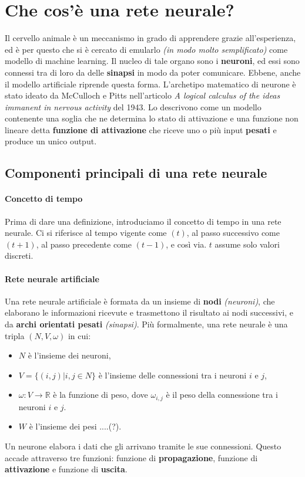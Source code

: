 \documentclass[12pt, twoside, letterpaper]{report}
\begin{document}
		\section{Che cos'è una rete neurale?}
			Il cervello animale è un meccanismo in grado di apprendere grazie all'esperienza, ed è per questo che si è cercato di emularlo \textit{(in modo molto semplificato)} come modello di machine learning. Il nucleo di tale organo sono i \textbf{neuroni}, ed essi sono connessi tra di loro da delle \textbf{sinapsi} in modo da poter comunicare. Ebbene, anche il modello artificiale riprende questa forma. L'archetipo matematico di neurone è stato ideato da McCulloch e Pitts nell'articolo \textit{A logical calculus of the ideas immanent in nervous activity} del 1943. Lo descrivono come un modello contenente una soglia che ne determina lo stato di attivazione e una funzione non lineare detta \textbf{funzione di attivazione} che riceve uno o più input \textbf{pesati} e produce un unico output.
			
		\subsection{Componenti principali di una rete neurale} 
			\paragraph{Concetto di tempo} Prima di dare una definizione, introduciamo il concetto di tempo in una rete neurale. Ci si riferisce al tempo vigente come $(t)$, al passo successivo come $(t+1)$, al passo precedente come $(t-1)$, e così via. $t$ assume solo valori discreti.
			
			\paragraph{Rete neurale artificiale} Una rete neurale artificiale è formata da un insieme di \textbf{nodi} \textit{(neuroni)}, che elaborano le informazioni ricevute e trasmettono il risultato ai nodi successivi, e da \textbf{archi orientati pesati} \textit{(sinapsi)}. Più formalmente, una rete neurale è una tripla $(N,V, \omega)$ in cui:
			\begin{itemize}
				\item $N$ è l'insieme dei neuroni,
				\item $V = \{(i,j) | i,j \in N\}$ è l'insieme delle connessioni tra i neuroni $i$ e $j$, %
				\item $\omega: V \rightarrow \mathbb{R}$ è la funzione di peso, dove $\omega_{i,j}$ è il peso della connessione tra i neuroni $i$ e $j$. %
				\item $W$ è l'insieme dei pesi ....(?).
			\end{itemize}
			Un neurone elabora i dati che gli arrivano tramite le sue connessioni. Questo accade attraverso tre funzioni: funzione di \textbf{propagazione}, funzione di \textbf{attivazione} e funzione di \textbf{uscita}.
			
\end{document}
